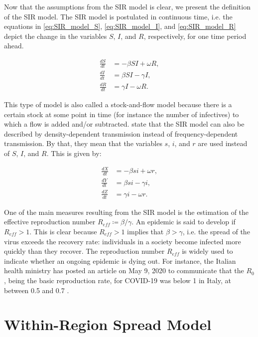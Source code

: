 \documentclass[12pt]{article}
\begin{document}
	Now that the assumptions from the SIR model is clear, we present the definition of the SIR model. The SIR model is postulated in continuous time, i.e. the equations in \eqref{eq:SIR_model_S}, \eqref{eq:SIR_model_I}, and \eqref{eq:SIR_model_R} depict the change in the variables $S$, $I$, and $R$, respectively, for one time period ahead.
	
	\begin{align}
    	\frac{dS}{dt} &= -\beta SI + \omega R, \label{eq:SIR_model_S}\\
    	\frac{dI}{dt} &= \beta SI - \gamma I, \label{eq:SIR_model_I}\\
    	\frac{dR}{dt} &= \gamma I - \omega R. \label{eq:SIR_model_R}
	\end{align}
	
	This type of model is also called a stock-and-flow model because there is a certain stock at some point in time (for instance the number of infectives) to which a flow is added and/or subtracted. \textcite{keeling2011modeling} state that the SIR model can also be described by density-dependent transmission instead of frequency-dependent transmission. By that, they mean that the variables $s$, $i$, and $r$ are used instead of $S$, $I$, and $R$. This is given by:
	
	\begin{align}
    	\frac{dX}{dt} &= -\beta si + \omega r, \label{eq:SIR_model_X}\\
    	\frac{dY}{dt} &= \beta si - \gamma i, \label{eq:SIR_model_Y}\\
    	\frac{dZ}{dt} &= \gamma i - \omega r. \label{eq:SIR_model_Z}
	\end{align}
	
	One of the main measures resulting from the SIR model is the estimation of the effective reproduction number $R_{eff} \coloneqq \beta / \gamma$. An epidemic is said to develop if $R_{eff} > 1$. This is clear because $R_{eff} > 1$ implies that $\beta > \gamma$, i.e. the spread of the virus exceeds the recovery rate: individuals in a society become infected more quickly than they recover. The reproduction number $R_{eff}$ is widely used to indicate whether an ongoing epidemic is dying out. For instance, the Italian health ministry has posted an article on May 9, 2020 to communicate that the $R_0$, being the basic reproduction rate, for COVID-19 was below 1 in Italy, at between 0.5 and 0.7 \parencite{saluteR0}.
	
	\section{Within-Region Spread Model} \label{sec:model_within}
\end{document}
